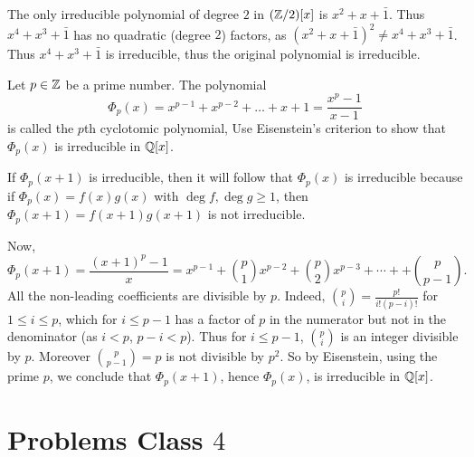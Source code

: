 \documentclass[10pt, a4paper]{article}
\begin{document}
\begin{problem}[Question $3$]
\begin{solution}
\begin{enumerate}[label = (\roman*)]
            The only irreducible polynomial of degree $2$ in $(\mathbb{Z} / 2)[x]$ is $x ^ 2 + x + \bar{1}$.
            Thus $x ^ 4 + x ^ 3 + \bar{1}$ has no quadratic
            (degree $2$)
            factors,
            as $(x ^ 2 + x + \bar{1}) ^ 2 \neq x ^ 4 + x ^ 3 + \bar{1}$.
            Thus $x ^ 4 + x ^ 3 + \bar{1}$ is irreducible,
            thus the original polynomial is irreducible.
        \end{enumerate}
    \end{solution}
\end{problem}

\begin{problem}[Question $8$]
    Let $p \in \mathbb{Z}$ be a prime number.
    The polynomial
    \[
    \Phi_{p}(x) = x ^ {p - 1} + x ^ {p - 2} + \dotsc + x + 1 = \frac{x ^ p - 1}{x - 1}
    \]
    is called the $p$th cyclotomic polynomial,
    Use Eisenstein's criterion to show that $\Phi_{p}(x)$ is irreducible in $\mathbb{Q}[x]$.

    \begin{solution}
        If $\Phi_p(x + 1)$ is irreducible,
        then it will follow that $\Phi_p(x)$ is irreducible because if $\Phi_p(x) = f(x)g(x)$ with $\deg{f}, \deg{g} \geq 1$,
        then $\Phi_{p}(x + 1) = f(x + 1)g(x + 1)$ is not irreducible.

        Now,
        \[
        \Phi_p(x + 1) = \frac{(x + 1) ^ p - 1}{x} = x ^ {p - 1} + \binom{p}{1}x ^ {p - 2} + \binom{p}{2}x ^ {p - 3} + \dotsi + + \binom{p}{p - 1}.
        \]
        All the non-leading coefficients are divisible by $p$.
        Indeed,
        $\binom{p}{i} = \frac{p!}{i!(p - i)!}$ for $1 \leq i \leq p$,
        which for $i \leq p - 1$ has a factor of $p$ in the numerator but not in the denominator
        (as $i < p$,
        $p - i < p$).
        Thus for $i \leq p - 1$,
        $\binom{p}{i}$ is an integer divisible by $p$.
        Moreover $\binom{p}{p - 1} = p$ is not divisible by $p ^ 2$.
        So by Eisenstein,
        using the prime $p$,
        we conclude that $\Phi_{p}(x + 1)$,
        hence $\Phi_{p}(x)$,
        is irreducible in $\mathbb{Q}[x]$.
    \end{solution}
\end{problem}

\newpage

\section{Problems Class \texorpdfstring{$4$}{}}
\end{document}
